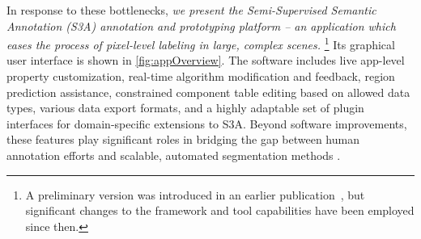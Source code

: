 In response to these bottlenecks, \emph{we present the Semi-Supervised Semantic Annotation (S3A) annotation and prototyping platform -- an application which eases the process of pixel-level labeling in large, complex scenes.}%
\footnote{A preliminary version was introduced in an earlier publication~\cite{jessurunComponentDetectionEvaluation2020}, but significant changes to the framework and tool capabilities have been employed since then.}
Its graphical user interface is shown in \autoref{fig:appOverview}.
The software includes live app-level property customization, real-time algorithm modification and feedback, region prediction assistance, constrained component table editing based on allowed data types, various data export formats, and a highly adaptable set of plugin interfaces for domain-specific extensions to S3A.
Beyond software improvements, these features play significant roles in bridging the gap between human annotation efforts and scalable, automated segmentation methods \cite{Branson_humansInLoop}.

\makeAppOverviewFig
